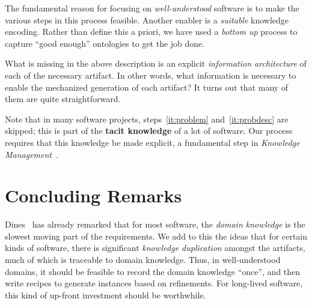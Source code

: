 \documentclass[a4paper,UKenglish,cleveref,autoref,thm-restate]{oasics-v2021}
\begin{document}
The fundamental reason for focusing on \emph{well-understood} software is to
make the various steps in this process feasible. Another enabler is a
\emph{suitable} knowledge encoding. Rather than define this a priori, we have
used a \emph{bottom up} process to capture ``good enough'' ontologies to get the
job done.

What is missing in the above description is an explicit \emph{information
architecture} of each of the necessary artifact. In other words, what
information is necessary to enable the mechanized generation of each artifact?
It turns out that many of them are quite straightforward.

Note that in many software projects, steps~\ref{it:problem}
and~\ref{it:probdesc} are skipped; this is part of the \textbf{tacit knowledge}
of a lot of software.  Our process requires that this knowledge be made
explicit, a fundamental step in \emph{Knowledge Management}~\cite{Dalkir2011}.


\section{Concluding Remarks}
\label{sec:concluding-remarks}




Dines~\cite{bjorner2021domaineng} has already remarked that for most software,
the \emph{domain knowledge} is the slowest moving part of the requirements.
We add to this the ideas that for certain kinds of software, there is significant
\emph{knowledge duplication} amongst the artifacts, much of which is traceable
to domain knowledge. Thus, in well-understood domains, it should be feasible to
record the domain knowledge ``once'', and then write recipes to generate
instances based on refinements. For long-lived software, this kind of up-front
investment should be worthwhile.
\end{document}
